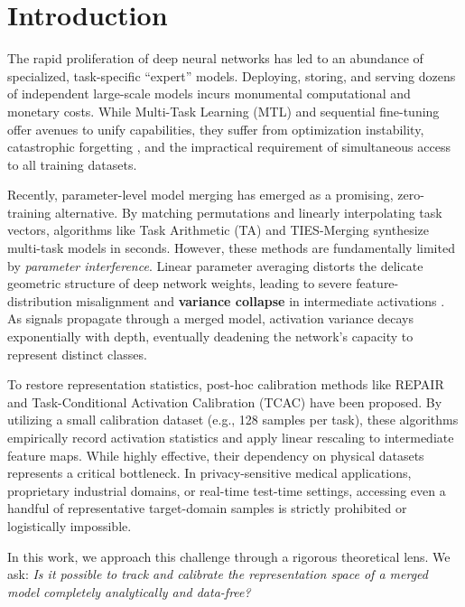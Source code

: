 \documentclass{article}
\theoremstyle{plain}
\theoremstyle{definition}
\theoremstyle{remark}
\begin{document}
\section{Introduction}
\label{sec:intro}

The rapid proliferation of deep neural networks has led to an abundance of specialized, task-specific ``expert'' models. Deploying, storing, and serving dozens of independent large-scale models incurs monumental computational and monetary costs. While Multi-Task Learning (MTL) \cite{caruana1997multitask} and sequential fine-tuning offer avenues to unify capabilities, they suffer from optimization instability, catastrophic forgetting \cite{kirkpatrick2017overcoming}, and the impractical requirement of simultaneous access to all training datasets.

Recently, parameter-level model merging \cite{wortsman2022model,ilharco2022editing} has emerged as a promising, zero-training alternative. By matching permutations \cite{ainsworth2022git} and linearly interpolating task vectors, algorithms like Task Arithmetic (TA) \cite{ilharco2022editing} and TIES-Merging \cite{yadav2023ties} synthesize multi-task models in seconds. However, these methods are fundamentally limited by \textit{parameter interference}. Linear parameter averaging distorts the delicate geometric structure of deep network weights, leading to severe feature-distribution misalignment and \textbf{variance collapse} in intermediate activations \cite{jordan2022repair,submission5}. As signals propagate through a merged model, activation variance decays exponentially with depth, eventually deadening the network's capacity to represent distinct classes.

To restore representation statistics, post-hoc calibration methods like REPAIR \cite{jordan2022repair} and Task-Conditional Activation Calibration (TCAC) \cite{submission5} have been proposed. By utilizing a small calibration dataset (e.g., 128 samples per task), these algorithms empirically record activation statistics and apply linear rescaling to intermediate feature maps. While highly effective, their dependency on physical datasets represents a critical bottleneck. In privacy-sensitive medical applications, proprietary industrial domains, or real-time test-time settings, accessing even a handful of representative target-domain samples is strictly prohibited or logistically impossible.

In this work, we approach this challenge through a rigorous theoretical lens. We ask: \textit{Is it possible to track and calibrate the representation space of a merged model completely analytically and data-free?}
\end{document}
